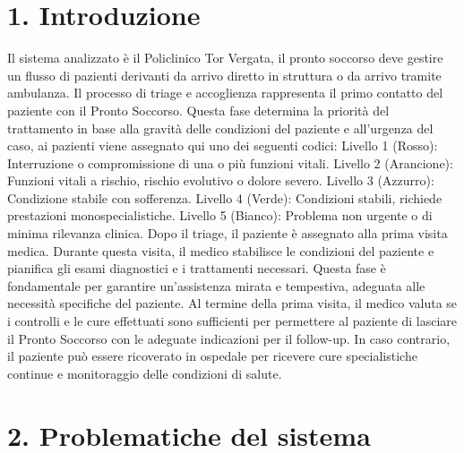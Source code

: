 \documentclass{article}
\begin{document}
\begin{multicols}{2}

\section{1. Introduzione}
Il sistema analizzato è il Policlinico Tor Vergata, il pronto soccorso deve gestire un flusso di pazienti derivanti da arrivo diretto in struttura o da arrivo tramite ambulanza. Il processo di triage e accoglienza rappresenta il primo contatto del paziente con il Pronto Soccorso. Questa fase determina la priorità del trattamento in base alla gravità delle condizioni del paziente e all'urgenza del caso, ai pazienti viene assegnato qui uno dei seguenti codici: \newline \newline 
Livello 1 (Rosso): Interruzione o compromissione di una o più funzioni vitali. \newline
Livello 2 (Arancione): Funzioni vitali a rischio, rischio evolutivo o dolore severo. \newline
Livello 3 (Azzurro): Condizione stabile con sofferenza. \newline
Livello 4 (Verde): Condizioni stabili, richiede prestazioni monospecialistiche. \newline
Livello 5 (Bianco): Problema non urgente o di minima rilevanza clinica. \newline \newline
Dopo il triage, il paziente è assegnato alla prima visita medica. Durante questa visita, il medico stabilisce le condizioni del paziente e pianifica gli esami diagnostici e i trattamenti necessari. Questa fase è fondamentale per garantire un'assistenza mirata e tempestiva, adeguata alle necessità specifiche del paziente.
Al termine della prima visita, il medico valuta se i controlli e le cure effettuati sono sufficienti per permettere al paziente di lasciare il Pronto Soccorso con le adeguate indicazioni per il follow-up. In caso contrario, il paziente può essere ricoverato in ospedale per ricevere cure specialistiche continue e monitoraggio delle condizioni di salute. \newline


\section{2. Problematiche del sistema}


\columnbreak


\end{multicols}
\end{document}
